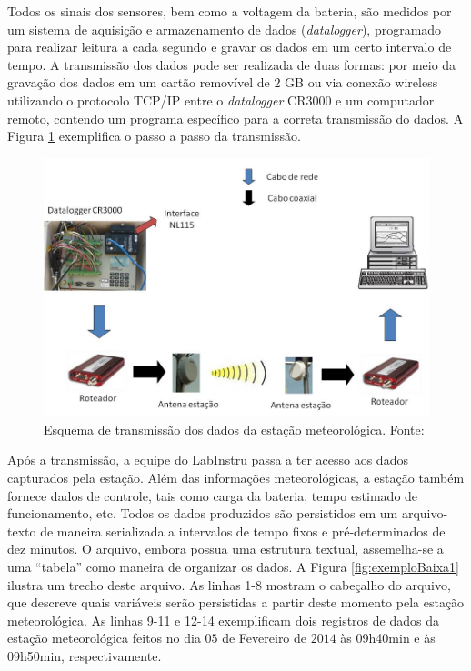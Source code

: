 Todos os sinais dos sensores, bem como a voltagem da bateria, são medidos por um sistema de aquisição e armazenamento de dados (\emph{datalogger}), programado para realizar leitura a cada segundo e gravar os dados em um certo intervalo de tempo. A transmissão dos dados pode ser realizada de duas formas: por meio da gravação dos dados em um cartão removível de $2$ GB ou via conexão wireless utilizando o protocolo TCP/IP entre o \emph{datalogger} CR3000 e um computador remoto, contendo um programa específico para a correta transmissão do dados. A Figura \ref{fig:ema4} exemplifica o passo a passo da transmissão.

\begin{figure}[H]
	\centering
	\includegraphics[width=1\textwidth]{./img/ema4.png}
	\caption{Esquema de transmissão dos dados da estação meteorológica. Fonte: \cite{Labinstru:EST}} \label{fig:ema4}
\end{figure}

Após a transmissão, a equipe do LabInstru passa a ter acesso aos dados capturados pela estação.  Além das informações meteorológicas, a estação também fornece dados de controle, tais como carga da bateria, tempo estimado de funcionamento, etc. Todos os dados produzidos são persistidos em um arquivo-texto de maneira serializada a intervalos de tempo fixos e pré-determinados de dez minutos. O arquivo, embora possua uma estrutura textual, assemelha-se a uma ``tabela'' como maneira de organizar os dados. A Figura \ref{fig:exemploBaixa1} ilustra um trecho deste arquivo. As linhas 1-8 mostram o cabeçalho do arquivo, que descreve quais variáveis serão persistidas a partir deste momento pela estação meteorológica. As linhas 9-11 e 12-14 exemplificam dois registros de dados da estação meteorológica feitos no dia $05$ de Fevereiro de $2014$ às 09h40min e às 09h50min, respectivamente.

